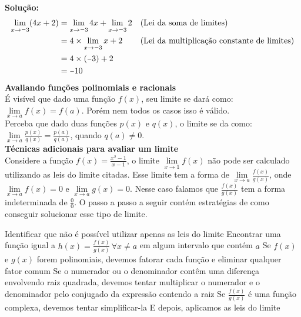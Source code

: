 \documentclass[12pt,a4paper,brazil]{article}
\newcommand{\minus}{\scalebox{0.75}[1.0]{$-$}}
\begin{document}
\textbf{Solução:}
\begin{equation*}
	\begin{aligned}
		\lim\limits_{x \to \minus3} (4x + 2) &= \lim\limits_{x \to \minus3} 4x + \lim\limits_{x \to \minus3} 2 & & \text{(Lei da soma de limites)} \\
											 &= 4 \times \lim\limits_{x \to \minus3} x + 2 & & \text{(Lei da multiplicação constante de limites)} \\
											 &= 4 \times (\minus3) + 2 \\
											 &= \minus10
	\end{aligned}
\end{equation*}
\textbf{Avaliando funções polinomiais e racionais} \\
É visível que dado uma função $f(x)$, seu limite se dará como:
$\lim\limits_{x \to a} f(x) = f(a)$. Porém nem todos os casos isso é válido. \\
Perceba que dado duas funções $p(x)$ e $q(x)$, o limite se da como:
$\lim\limits_{x \to a} \frac{p(x)}{q(x)} = \frac{p(a)}{q(a)}$, quando $q(a) \neq 0$.
\vspace{5mm} \\ %
\textbf{Técnicas adicionais para avaliar um limite} \\
Considere a função $f(x) = \frac{x^2 - 1}{x - 1}$, o limite $\lim\limits_{x \to 1} f(x)$
não pode ser calculado utilizando as leis do limite citadas. Esse limite tem a forma de
$\lim\limits_{x \to a} \frac{f(x)}{g(x)}$, onde $\lim\limits_{x \to a} f(x) = 0$ e $\lim\limits_{x \to a} g(x) = 0$.
Nesse caso falamos que $\frac{f(x)}{g(x)}$ tem a forma indeterminada de $\frac{0}{0}$.
O passo a passo a seguir contém estratégias de como conseguir solucionar esse tipo de limite.
\begin{outline}[enumerate]
	\1 Identificar que não é possível utilizar apenas as leis do limite
	\1 Encontrar uma função igual a $h(x) = \frac{f(x)}{g(x)}\,\forall x \neq a$ em algum intervalo que contém $a$
	\2 Se $f(x)$ e $g(x)$ forem polinomiais, devemos fatorar cada função e eliminar qualquer fator comum
	\2 Se o numerador ou o denominador contêm uma diferença envolvendo raiz quadrada, devemos tentar multiplicar
	o numerador e o denominador pelo conjugado da expressão contendo a raiz
	\2 Se $\frac{f(x)}{g(x)}$ é uma função complexa, devemos tentar simplificar-la
	\1 E depois, aplicamos as leis do limite
\end{outline}
\end{document}
